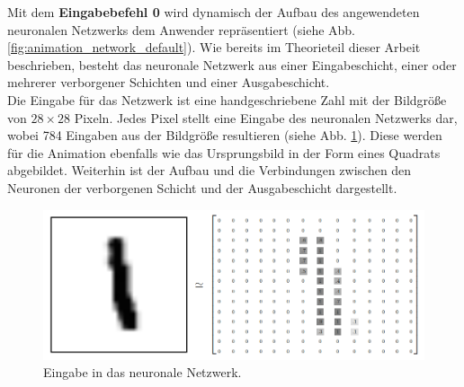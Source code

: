 \noindent 
Mit dem \textbf{Eingabebefehl 0} wird dynamisch der Aufbau des angewendeten neuronalen Netzwerks dem Anwender repräsentiert (siehe Abb. \ref{fig:animation_network_default}). Wie bereits im Theorieteil dieser Arbeit beschrieben, besteht das neuronale Netzwerk aus einer Eingabeschicht, einer oder mehrerer verborgener Schichten und einer Ausgabeschicht. \\
\noindent
Die Eingabe für das Netzwerk ist eine handgeschriebene Zahl mit der Bildgröße von $28 \times 28$ Pixeln. Jedes Pixel stellt eine Eingabe des neuronalen Netzwerks dar, wobei 784 Eingaben aus der Bildgröße resultieren (siehe Abb. \ref{fig:MNIST-Matrix}). Diese werden für die Animation ebenfalls wie das Ursprungsbild in der Form eines Quadrats abgebildet. Weiterhin ist der Aufbau und die Verbindungen zwischen den Neuronen der verborgenen Schicht und der Ausgabeschicht dargestellt. \\

\begin{figure}[hbt]
	\centering
	\includegraphics[scale=0.43]{Bilder/MNIST-Matrix}
	\caption{Eingabe in das neuronale Netzwerk.} 
	\label{fig:MNIST-Matrix} 
\end{figure}

